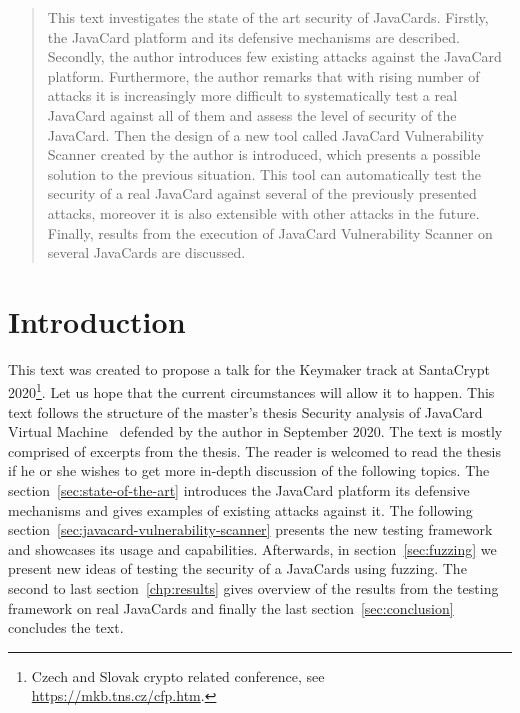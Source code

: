 \documentclass{../llncs/llncs}
\begin{document}
\maketitle

\begin{abstract}
This text investigates the state of the art security of JavaCards. Firstly, the JavaCard platform and its defensive mechanisms are described. Secondly, the author introduces few existing attacks against the JavaCard platform. Furthermore, the author remarks that with rising number of attacks it is increasingly more difficult to systematically test a real JavaCard against all of them and assess the level of security of the JavaCard. Then the design of a new tool called JavaCard Vulnerability Scanner created by the author is introduced, which presents a possible solution to the previous situation. This tool can automatically test the security of a real JavaCard against several of the previously presented attacks, moreover it is also extensible with other attacks in the future. Finally, results from the execution of JavaCard Vulnerability Scanner on several JavaCards are discussed.
\end{abstract}



\section{Introduction}

This text was created to propose a talk for the Keymaker track at SantaCrypt 2020\footnote{Czech and Slovak crypto related conference, see \url{https://mkb.tns.cz/cfp.htm}.}. Let us hope that the current circumstances will allow it to happen. This text follows the structure of the master's thesis Security analysis of JavaCard Virtual Machine~\cite{anon2020thesis} defended by the author in September 2020. The text is mostly comprised of excerpts from the thesis. The reader is welcomed to read the thesis if he or she wishes to get more in-depth discussion of the following topics.
The section~\ref{sec:state-of-the-art} introduces the JavaCard platform its defensive mechanisms and gives examples of existing attacks against it. The following section~\ref{sec:javacard-vulnerability-scanner} presents the new testing framework \projectname and showcases its usage and capabilities. Afterwards, in section~\ref{sec:fuzzing} we present new ideas of testing the security of a JavaCards using fuzzing. The second to last section~\ref{chp:results} gives overview of the results from the testing framework on real JavaCards and finally the last section~\ref{sec:conclusion} concludes the text.
\end{document}
